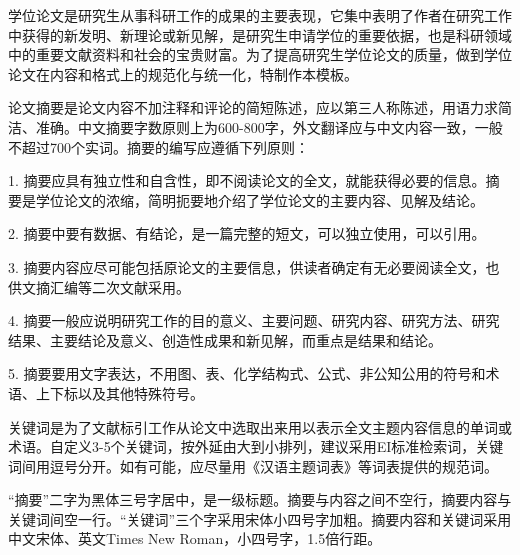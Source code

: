 \documentclass{cqupt_thesis}
\begin{document}



    \makecover %
    \makestatement %


    \begin{cnabstract}

        学位论文是研究生从事科研工作的成果的主要表现，它集中表明了作者在研究工作中获得的新发明、新理论或新见解，是研究生申请学位的重要依据，也是科研领域中的重要文献资料和社会的宝贵财富。为了提高研究生学位论文的质量，做到学位论文在内容和格式上的规范化与统一化，特制作本模板。

        论文摘要是论文内容不加注释和评论的简短陈述，应以第三人称陈述，用语力求简洁、准确。中文摘要字数原则上为600-800字，外文翻译应与中文内容一致，一般不超过700个实词。摘要的编写应遵循下列原则：

        1. 摘要应具有独立性和自含性，即不阅读论文的全文，就能获得必要的信息。摘要是学位论文的浓缩，简明扼要地介绍了学位论文的主要内容、见解及结论。

        2. 摘要中要有数据、有结论，是一篇完整的短文，可以独立使用，可以引用。

        3. 摘要内容应尽可能包括原论文的主要信息，供读者确定有无必要阅读全文，也供文摘汇编等二次文献采用。

        4. 摘要一般应说明研究工作的目的意义、主要问题、研究内容、研究方法、研究结果、主要结论及意义、创造性成果和新见解，而重点是结果和结论。

        5. 摘要要用文字表达，不用图、表、化学结构式、公式、非公知公用的符号和术语、上下标以及其他特殊符号。

        关键词是为了文献标引工作从论文中选取出来用以表示全文主题内容信息的单词或术语。自定义3-5个关键词，按外延由大到小排列，建议采用EI标准检索词，关键词间用逗号分开。如有可能，应尽量用《汉语主题词表》等词表提供的规范词。

        “摘要”二字为黑体三号字居中，是一级标题。摘要与内容之间不空行，摘要内容与关键词间空一行。“关键词”三个字采用宋体小四号字加粗。摘要内容和关键词采用中文宋体、英文Times New Roman，小四号字，1.5倍行距。

    \end{cnabstract}
\end{document}
